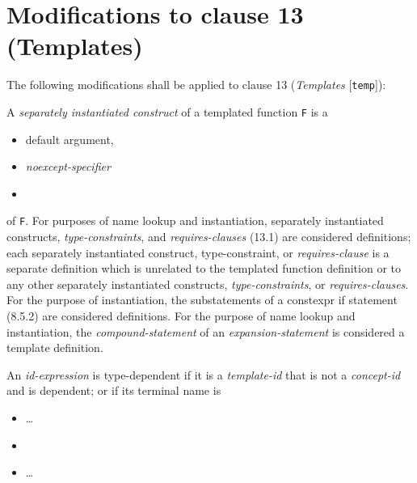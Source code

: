 \section{Modifications to clause 13 (Templates)}

The following modifications shall be applied to clause 13 (\emph{Templates}
[\texttt{temp}]):

\begin{modification}
A \emph{separately instantiated construct} of a templated function \texttt{F} is a

\begin{itemize}[label=\textemdash]

\item
default argument, 

\item
\emph{noexcept-specifier}

\item
{}

\end{itemize}

of \texttt{F}. For purposes of name lookup and instantiation, separately
instantiated constructs, \emph{type-constraints}, and
\emph{requires-clauses} (13.1) are considered definitions; each separately
instantiated construct, type-constraint, or \emph{requires-clause} is a
separate definition which is unrelated to the templated function definition or
to any other separately instantiated constructs, \emph{type-constraints}, or
\emph{requires-clauses}. For the purpose of instantiation, the substatements of
a constexpr if statement (8.5.2) are considered definitions. For the purpose of
name lookup and instantiation, the \emph{compound-statement} of an
\emph{expansion-statement} is considered a template definition.
\end{modification}

\begin{modification}
An \emph{id-expression} is type-dependent if it is a \emph{template-id} that is
not a \emph{concept-id} and is dependent; or if its
terminal name is

\begin{itemize}[label=\textemdash]

\item \ldots

\item
{}
\item \ldots

\end{itemize}

\end{modification}

